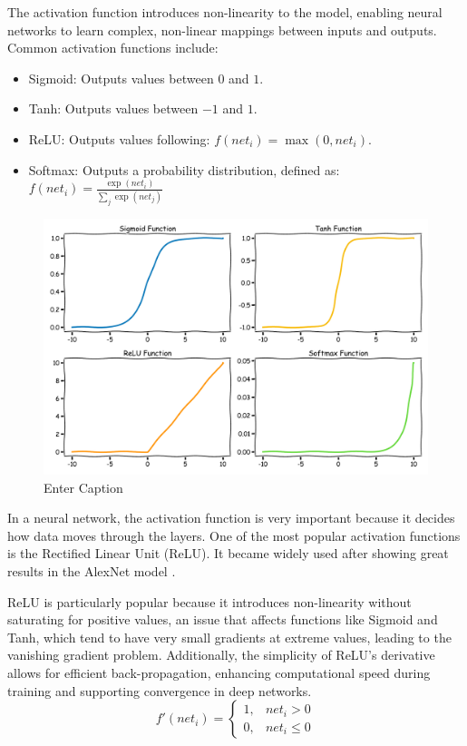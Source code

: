 The activation function introduces non-linearity to the model, enabling neural networks to learn complex, non-linear mappings between inputs and outputs. Common activation functions include:
\begin{itemize}
    \item Sigmoid: Outputs values between $0$ and $1$.
    \item Tanh: Outputs values between $-1$ and $1$.
    \item ReLU: Outputs values following: $f(\textit{net}_i) = \max(0, \textit{net}_i)$.
    \item Softmax: Outputs a probability distribution, defined as: $f(\textit{net}_i) = \frac{\exp(\textit{net}_i)}{\sum_{j} \exp(\textit{net}_j)}$
\end{itemize}


\begin{figure}[H]
    \centering
    \includegraphics[width=1\linewidth]{LateX//figs/activation_functions_xkcd.pdf}
    \caption{Enter Caption}
    \label{fig:enter-label}
\end{figure}

In a neural network, the activation function is very important because it decides how data moves through the layers. One of the most popular activation functions is the Rectified Linear Unit (ReLU). It became widely used after showing great results in the AlexNet model \cite{NIPS2012_c399862d}.

ReLU is particularly popular because it introduces non-linearity without saturating for positive values, an issue that affects functions like Sigmoid and Tanh, which tend to have very small gradients at extreme values, leading to the vanishing gradient problem. Additionally, the simplicity of ReLU’s derivative allows for efficient back-propagation, enhancing computational speed during training and supporting convergence in deep networks.
\begin{equation}
    f'(\textit{net}_i) =
    \begin{cases}
    1, & \textit{net}_i > 0 \\
    0, & \textit{net}_i \leq 0
    \end{cases}
\end{equation}

